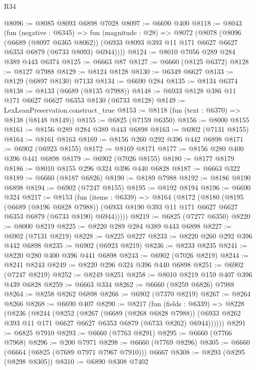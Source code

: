 \begin{lexlean}{R34}
\begin{coremodule}
@8096 := @8085 @8093 @6898 @7028
@8097 := @6690 @400
@8118 := @8043
    (fun (negative : @6345) =>
    fun (magnitude : @28) =>
    @8072
      (@8078
        (@8096
          (@6689 (@8097 @6365 @8062))
          (@6933 @8093 @393 @11 @171 @6627 @6627 @6353 @6879 (@6733 @8093) @6944))))
@8124 := @8010 @7056 @289 @284 @389 @443 @6374
@8125 := @6663 @87
@8127 := @6660 (@8125 @6372)
@8128 := @8127 @7988
@8129 := @8124 @8128
@8130 := @6349 @6627
@8133 := @8129 (@6897 @8130) @7133
@8134 := @6690 @284
@8135 := @8134 @6374
@8138 := @8133 (@6689 (@8135 @7988))
@8148 := @6933 @8128 @386 @11 @171 @6627 @6627 @6353 @8130 (@6733 @8128)
@8149 := LexLeanPreservation.construct_true
@8153 := @8118 (fun (text : @6370) => @8138 (@8148 @8149))
@8155 := @6825 (@7159 @6350)
@8156 := @8000 @8155
@8161 := @8156 @289 @284 @389 @443 @6898
@8163 := @6902 (@7131 @8155)
@8164 := @8161 @8163
@8169 := @8156 @260 @292 @396 @442 @6898
@8171 := @6902 (@6923 @8155)
@8172 := @8169 @8171
@8177 := @8156 @280 @400 @396 @441 @6898
@8179 := @6902 (@7026 @8155)
@8180 := @8177 @8179
@8186 := @8010 @8155 @296 @324 @396 @440 @6828
@8187 := @6663 @322
@8189 := @6660 (@8187 @6826)
@8190 := @8189 @7988
@8192 := @8186 @8190 @6898
@8194 := @6902 (@7247 @8155)
@8195 := @8192 @8194
@8196 := @6690 @324
@8217 := @8153
    (fun (items : @6339) =>
    @8164
      (@8172
        (@8180
          (@8195
            (@6689 (@8196 @6828 @7988))
            (@6933 @8190 @393 @11 @171 @6627 @6627 @6353 @6879 (@6733 @8190) @6944)))))
@8219 := @6825 (@7277 @6350)
@8220 := @8000 @8219
@8225 := @8220 @289 @284 @389 @443 @6898
@8227 := @6902 (@7131 @8219)
@8228 := @8225 @8227
@8233 := @8220 @260 @292 @396 @442 @6898
@8235 := @6902 (@6923 @8219)
@8236 := @8233 @8235
@8241 := @8220 @280 @400 @396 @441 @6898
@8243 := @6902 (@7026 @8219)
@8244 := @8241 @8243
@8249 := @8220 @296 @324 @396 @440 @6898
@8251 := @6902 (@7247 @8219)
@8252 := @8249 @8251
@8258 := @8010 @8219 @159 @407 @396 @439 @6828
@8259 := @6663 @334
@8262 := @6660 (@8259 @6826) @7988
@8264 := @8258 @8262 @6898
@8266 := @6902 (@7370 @8219)
@8267 := @8264 @8266
@8268 := @6690 @407
@8290 := @8217
    (fun (fields : @6339) =>
    @8228
      (@8236
        (@8244
          (@8252
            (@8267
              (@6689 (@8268 @6828 @7988))
              (@6933 @8262 @393 @11 @171 @6627 @6627 @6353 @6879 (@6733 @8262) @6944))))))
@8291 := @6825 @7910
@8293 := @6660 (@7763 @8291)
@8295 := @6660 (@7766 @7968)
@8296 := @200 @7971
@8298 := @6660 (@7769 @8296)
@8305 := @6660 (@6664 (@6825 (@7689 @7971 @7967 @7910))) @6667
@8308 := @8293 (@8295 (@8298 @8305))
@8310 := @6890 @8308 @7402

\end{coremodule}
\end{lexlean}
